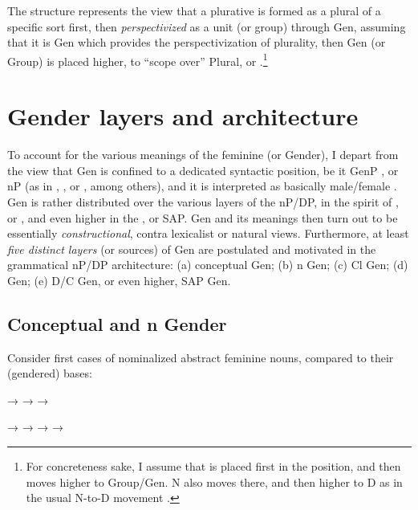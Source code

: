 The structure represents the view that a plurative is formed as a plural of a
specific sort first, then \textit{perspectivized} as a unit (or group) through
Gen, assuming that it is Gen which provides the perspectivization of plurality,
then Gen (or Group) is placed higher, to ``scope over'' Plural, or
.\footnote{For concreteness sake, I assume that  is placed first in
the  position, and then moves higher to Group/Gen. N also moves there, and
then higher to D as in the usual N-to-D movement
\citep[see][]{Longobardi2001,FassiFehri1993}.}

\section{Gender layers and architecture}\label{sec:fassi:layers}

To account for the various meanings of the feminine (or Gender), I depart from
the view that Gen is confined to a dedicated syntactic position, be it GenP
\citep[as in][]{Picallo2008}, or nP (as in \citealt{Kihm2005},
\citealt{Lowenstamm2008}, or \citealt{Kramer2014Gender}, among others), and it is
interpreted as basically male/female \citep{Percus2011}. Gen is rather
distributed over the various layers of the nP/DP, in the spirit of
\citet{SteriopoloEtAl2010,Pesetsky2013}, or \citet{Ritter1993}, and
even higher in the , or SAP\@. Gen and its meanings then turn out to be
essentially \textit{constructional}, contra lexicalist or natural views.
Furthermore, at least \textit{five distinct layers} (or sources) of Gen are
postulated and motivated in the grammatical nP/DP architecture: (a) conceptual
Gen; (b) n Gen; (c) Cl Gen; (d)  Gen; (e) D/C Gen, or even higher, SAP Gen.

\subsection{Conceptual and n Gender}

Consider first cases of nominalized abstract feminine nouns, compared to their
(gendered) bases:

\begin{exe}
  \ex\label{ex:fassi:30}
  \begin{xlist}
    \ex\label{ex:fassi:30a}  → 
    \ex\label{ex:fassi:30b}  → 
    \ex\label{ex:fassi:30c}  → 
  \end{xlist}
  \ex\label{ex:fassi:31}
  \begin{xlist}
    \ex\label{ex:fassi:31a}  →  → 
    \ex\label{ex:fassi:31b}  →  → 
  \end{xlist}
\end{exe}

